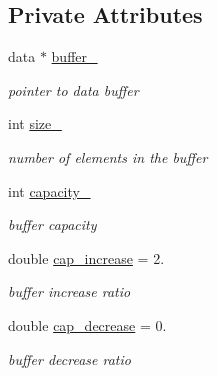 \subsection*{Private Attributes}
\begin{DoxyCompactItemize}
\item 
\mbox{\label{classVector_a22db58ae9e92c6014e8ac657804a035a}} 
data $\ast$ \hyperlink{classVector_a22db58ae9e92c6014e8ac657804a035a}{buffer\+\_\+}
\begin{DoxyCompactList}\small\item\em pointer to data buffer \end{DoxyCompactList}\item 
\mbox{\label{classVector_a3c70fa478530a90177f2a7e7621ee688}} 
int \hyperlink{classVector_a3c70fa478530a90177f2a7e7621ee688}{size\+\_\+}
\begin{DoxyCompactList}\small\item\em number of elements in the buffer \end{DoxyCompactList}\item 
\mbox{\label{classVector_ad75911bb39018821f0e2911b6905b7ec}} 
int \hyperlink{classVector_ad75911bb39018821f0e2911b6905b7ec}{capacity\+\_\+}
\begin{DoxyCompactList}\small\item\em buffer capacity \end{DoxyCompactList}\item 
\mbox{\label{classVector_ae612684de42f3ecdefd867b54d232647}} 
double \hyperlink{classVector_ae612684de42f3ecdefd867b54d232647}{cap\+\_\+increase} = 2.
\begin{DoxyCompactList}\small\item\em buffer increase ratio \end{DoxyCompactList}\item 
\mbox{\label{classVector_a7c1b2a56c4404a51eeb97e33ec0ca528}} 
double \hyperlink{classVector_a7c1b2a56c4404a51eeb97e33ec0ca528}{cap\+\_\+decrease} = 0.
\begin{DoxyCompactList}\small\item\em buffer decrease ratio \end{DoxyCompactList}\end{DoxyCompactItemize}


